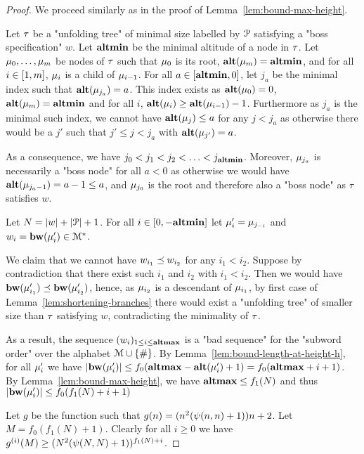 \begin{proof}
	We proceed similarly as in the proof of Lemma~\ref{lem:bound-max-height}.
	
	Let $\tau$ be a "unfolding tree" of minimal size labelled by $\mathcal{P}$ satisfying a "boss specification" $w$. Let $\mathbf{altmin}$ be the minimal altitude of a node in $\tau$. Let $\mu_0, \ldots, \mu_m$ be nodes of $\tau$ such that $\mu_0$ is its root, $\mathbf{alt}(\mu_m) = \mathbf{altmin}$, and for all $i\in [1,m]$, $\mu_i$ is a child of $\mu_{i-1}$.
	For all $a \in [\mathbf{altmin},0]$, let $j_a$ be the minimal index such that $\mathbf{alt}(\mu_{j_a}) = a$. This index exists as $\mathbf{alt}(\mu_0) = 0$, $\mathbf{alt}(\mu_m) = \mathbf{altmin}$ and for all $i$, $\mathbf{alt}(\mu_{i}) \geq \mathbf{alt}(\mu_{i-1})-1$.
	Furthermore as $j_a$ is the minimal such index, we cannot have $\mathbf{alt}(\mu_j) \leq a$ for any $j < j_a$ as otherwise there would be a $j'$ such that $j' \leq j < j_a$ with $\mathbf{alt}(\mu_{j'}) = a$.
	
	As a consequence, we have $j_0 < j_1 < j_2 < \ldots < j_{\mathbf{altmin}}$. Moreover, $\mu_{j_a}$ is necessarily a "boss node" for all $a<0$ as otherwise we would have $\mathbf{alt}(\mu_{j_a-1}) = a-1 \leq a$, and $\mu_{j_0}$ is the root and therefore also a "boss node" as $\tau$ satisfies $w$.
	
	Let $N = |w| + |\mathcal{P}|+1$. For all $i \in [0,-\mathbf{altmin}]$ let $\mu'_i = \mu_{j_{-i}}$ and $w_i = \mathbf{bw}(\mu'_{i}) \in \mathcal{M}^*$.
	
	We claim that we cannot have $w_{i_1}\preceq w_{i_2}$ for any  $i_1< i_2$.
	Suppose by contradiction that there exist such $i_1$ and $i_2$ with $i_1 < i_2$. Then we would have $\mathbf{bw}(\mu'_{i_1}) \preceq \mathbf{bw}(\mu'_{i_2})$, hence, as $\mu_{i_2}$ is a descendant of $\mu_{i_1}$, by first case of Lemma~\ref{lem:shortening-branches} there would exist a "unfolding tree" of smaller size than $\tau$ satisfying $w$, contradicting the minimality of $\tau$.
	
	As a result, the sequence $(w_i)_{1\leq i \leq \mathbf{altmax}}$ is a "bad sequence" for the "subword order" over the alphabet $\mathcal{M}\cup\{\#\}$.
	By Lemma~\ref{lem:bound-length-at-height-h}, for all $\mu'_i$ we have $|\mathbf{bw}(\mu'_i)| \leq f_0(\mathbf{altmax} - \mathbf{alt}(\mu'_i)+1) = f_0(\mathbf{altmax} +i+1)$.
	By Lemma~\ref{lem:bound-max-height}, we have $\mathbf{altmax} \leq f_1(N)$ and thus $|\mathbf{bw}(\mu'_i)| \leq  f_0(f_1(N) +i+1)$
	
	Let $g$ be the function such that $g(n) = (n^2(\psi(n,n)+1))n+2$. 
	Let $M = f_0(f_1(N)+1)$. Clearly for all $i\geq 0$ we have $g^{(i)}(M) \geq (N^2(\psi(N,N)+1))^{f_1(N) + i}$.
	

\end{proof}

